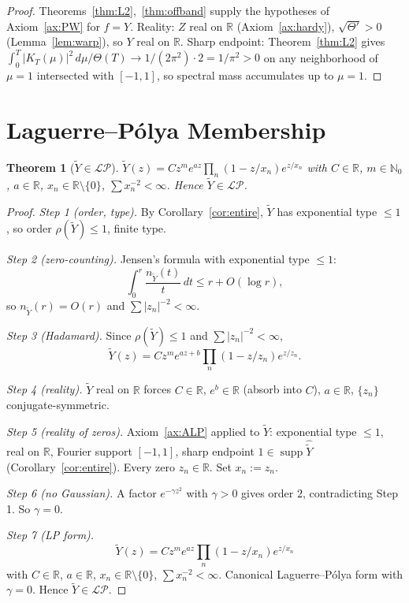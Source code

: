 \documentclass[11pt]{article}
\newtheorem{theorem}{Theorem}
\theoremstyle{definition}
\newcommand{\R}{\mathbb{R}}
\newcommand{\N}{\mathbb{N}}
\newcommand{\supp}{\operatorname{supp}}
\newcommand{\LP}{\mathcal{LP}}
\begin{document}
\begin{proof}
Theorems~\ref{thm:L2},~\ref{thm:offband} supply the hypotheses of Axiom~\ref{ax:PW} for \(f=Y\). Reality: \(Z\) real on \(\R\) (Axiom~\ref{ax:hardy}), \(\sqrt{\Theta'}>0\) (Lemma~\ref{lem:warp}), so \(Y\) real on \(\R\). Sharp endpoint: Theorem~\ref{thm:L2} gives \(\int_0^T|K_T(\mu)|^2\,d\mu/\Theta(T)\to 1/(2\pi^2)\cdot 2=1/\pi^2>0\) on any neighborhood of \(\mu=1\) intersected with \([-1,1]\), so spectral mass accumulates up to \(\mu=1\).
\end{proof}

\section{Laguerre--P\'olya Membership}

\begin{theorem}[\(\tilde Y\in\LP\)]\label{thm:LP}
\(\tilde Y(z)=Cz^m e^{az}\prod_n(1-z/x_n)e^{z/x_n}\) with \(C\in\R\), \(m\in\N_0\), \(a\in\R\), \(x_n\in\R\setminus\{0\}\), \(\sum x_n^{-2}<\infty\). Hence \(\tilde Y\in\LP\).
\end{theorem}

\begin{proof}
\emph{Step 1 (order, type).} By Corollary~\ref{cor:entire}, \(\tilde Y\) has exponential type \(\le 1\), so order \(\rho(\tilde Y)\le 1\), finite type.

\emph{Step 2 (zero-counting).} Jensen's formula with exponential type \(\le 1\):
\[
\int_0^r\frac{n_{\tilde Y}(t)}{t}\,dt\le r+O(\log r),
\]
so \(n_{\tilde Y}(r)=O(r)\) and \(\sum|z_n|^{-2}<\infty\).

\emph{Step 3 (Hadamard).} Since \(\rho(\tilde Y)\le 1\) and \(\sum|z_n|^{-2}<\infty\),
\[
\tilde Y(z)=Cz^m e^{az+b}\prod_n(1-z/z_n)e^{z/z_n}.
\]

\emph{Step 4 (reality).} \(\tilde Y\) real on \(\R\) forces \(C\in\R\), \(e^b\in\R\) (absorb into \(C\)), \(a\in\R\), \(\{z_n\}\) conjugate-symmetric.

\emph{Step 5 (reality of zeros).} Axiom~\ref{ax:ALP} applied to \(\tilde Y\): exponential type \(\le 1\), real on \(\R\), Fourier support \([-1,1]\), sharp endpoint \(1\in\supp\widehat{\tilde Y}\) (Corollary~\ref{cor:entire}). Every zero \(z_n\in\R\). Set \(x_n:=z_n\).

\emph{Step 6 (no Gaussian).} A factor \(e^{-\gamma z^2}\) with \(\gamma>0\) gives order \(2\), contradicting Step 1. So \(\gamma=0\).

\emph{Step 7 (LP form).}
\[
\tilde Y(z)=Cz^m e^{az}\prod_n(1-z/x_n)e^{z/x_n}
\]
with \(C\in\R\), \(a\in\R\), \(x_n\in\R\setminus\{0\}\), \(\sum x_n^{-2}<\infty\). Canonical Laguerre--P\'olya form with \(\gamma=0\). Hence \(\tilde Y\in\LP\).
\end{proof}
\end{document}
